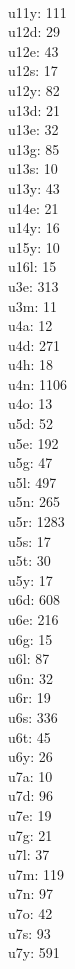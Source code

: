 \begin{multicols}{8}
  \\ u11y: 111
  \\ u12d: 29
  \\ u12e: 43
  \\ u12s: 17
  \\ u12y: 82
  \\ u13d: 21
  \\ u13e: 32
  \\ u13g: 85
  \\ u13s: 10
  \\ u13y: 43
  \\ u14e: 21
  \\ u14y: 16
  \\ u15y: 10
  \\ u16l: 15
  \\ u3e: 313
  \\ u3m: 11
  \\ u4a: 12
  \\ u4d: 271
  \\ u4h: 18
  \\ u4n: 1106
  \\ u4o: 13
  \\ u5d: 52
  \\ u5e: 192
  \\ u5g: 47
  \\ u5l: 497
  \\ u5n: 265
  \\ u5r: 1283
  \\ u5s: 17
  \\ u5t: 30
  \\ u5y: 17
  \\ u6d: 608
  \\ u6e: 216
  \\ u6g: 15
  \\ u6l: 87
  \\ u6n: 32
  \\ u6r: 19
  \\ u6s: 336
  \\ u6t: 45
  \\ u6y: 26
  \\ u7a: 10
  \\ u7d: 96
  \\ u7e: 19
  \\ u7g: 21
  \\ u7l: 37
  \\ u7m: 119
  \\ u7n: 97
  \\ u7o: 42
  \\ u7s: 93
  \\ u7y: 591

\end{multicols}

